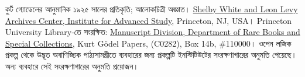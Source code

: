 কুর্ট গ্যোডেলের আনুমানিক ১৯২৫ সালের প্রতিকৃতি; আলোকচিত্রী অজ্ঞাত।
\href{https://library.ias.edu/archives}{Shelby White and Leon Levy
Archives Center, Institute for Advanced Study}, Princeton, NJ, USA।
Princeton University Library-তে সংরক্ষিত:
\href{http://rbsc.princeton.edu/divisions/manuscripts-division}{Manuscript
Division, Department of Rare Books and Special Collections},
Kurt G\"odel Papers, (C0282), Box 14b, \#110000।
ওপেন লজিক প্রকল্প থেকে উদ্ভূত অবাণিজ্যিক পাঠ্যসামগ্রীতে ব্যবহারের জন্য
প্রকল্পটি ইনস্টিটিউটের সংরক্ষণাগারের অনুমতি পেয়েছে। অন্য ব্যবহারে
সেই সংরক্ষণাগারের অনুমতি প্রয়োজন।
